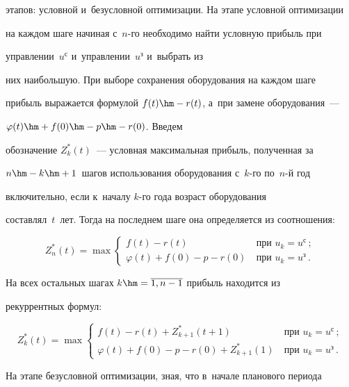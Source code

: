 этапов: условной и~безусловной оптимизации. На этапе условной оптимизации 


на каж\-дом шаге начиная с~$n$-го необходимо найти услов\-ную прибыль при 


управ\-ле\-нии~$u^{\mathrm{с}}$ и~управ\-ле\-нии~$u^{\mathrm{з}}$ и~вы\-брать из 


них наибольшую. При выборе сохранения оборудования на каж\-дом шаге 


прибыль выражается формулой $f(t) \hm- r(t)$, а~при замене оборудования~--- 


$\varphi (t)\hm + f(0) \hm- p \hm-r(0)$. Введем 


обозначение $Z_k^*(t)$~--- условная максимальная прибыль, полученная за 


$n\hm-  k \hm+ 1$~шагов использования оборудования с~$k$-го по~$n$-й год 


включительно, если к~началу $k$-го года возраст оборудования 


составлял~$t$~лет. Тогда на последнем шаге она определяется из соотношения:


  $$


  Z_n^*(t)=\max\begin{cases}


  f(t)-r(t) &\ \mbox{при } u_k=u^{\mathrm{с}}\,;\\


  \varphi(t)+f(0)-p-r(0) &\ \mbox{при } u_k=u^{\mathrm{з}}\,.


  \end{cases}


  $$


  


  На всех остальных шагах $k\hm= \overline{1,n-1}$ прибыль находится из 


рекуррентных формул:


  $$


  Z_k^*(t) =\max\begin{cases}


  f(t)-r(t)+Z^*_{k+1}(t+1) &\ \mbox{при } u_k=u^{\mathrm{с}}\,;\\


  \varphi(t) +f(0)-p-r(0)+Z^*_{k+1}(1) &\ \mbox{при } u_k=u^{\mathrm{з}}\,.


  \end{cases}


  $$


  


  На этапе безусловной оптимизации, зная, что в~начале планового периода 


